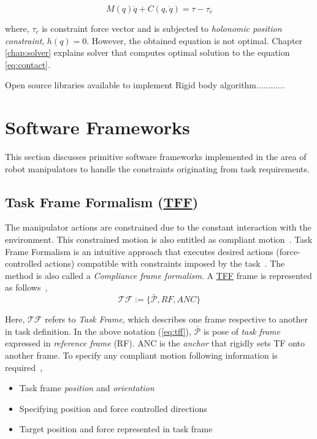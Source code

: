 \begin{equation}\label{eq:contact}
M(q)\ddot{q} + C(q, \ddot{q}) = \tau - \tau_c
\end{equation}

where, $\tau_c$ is constraint force vector and is subjected to \textit{holonomic position constraint}, $h(q) = 0$. However, the obtained equation is not optimal. Chapter \ref{chap:solver} explains solver that computes optimal solution to the equation \ref{eq:contact}.

{\color{red}Open source libraries available to implement Rigid body algorithm............}

%

\section{Software Frameworks} \label{sec:software}

This section discusses primitive software frameworks implemented in the area of robot manipulators to handle the constraints originating from task requirements. 

\subsection{Task Frame Formalism (\hyperref[tff]{TFF})}
The manipulator actions are constrained due to the constant interaction with the environment. This constrained motion is also entitled as compliant motion~\cite{kroger2004compliant}. Task Frame Formalism is an intuitive approach that executes desired actions (force-controlled actions) compatible with constraints imposed by the task~\cite{bruyninckx1996specification}. The method is also called a \textit{Compliance frame formalism}. A \hyperref[tff]{TFF} frame is represented as follows~\cite{kroger2004compliant},
\begin{equation}\label{eq:tff}
	\mathcal{TF} := \big\{ \bar{\mathcal{P}}, RF, ANC \big\}
\end{equation}

Here, $\mathcal{TF}$ refers to \textit{Task Frame}, which describes one frame respective to another in task definition. In the above notation (\ref{eq:tff}), $\bar{\mathcal{P}}$ is pose of \textit{task frame} expressed in \textit{reference frame} (RF). ANC is the \textit{anchor} that rigidly sets TF onto another frame. To specify any compliant motion following information is required~\cite{de1988compliant},
\begin{itemize}
	\item Task frame \textit{position} and \textit{orientation}
	\item Specifying position and force controlled directions
	\item Target position and force represented in task frame
\end{itemize}

